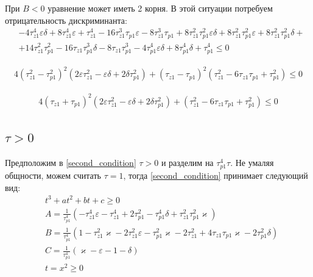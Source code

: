 \documentclass[a4paper,14pt]{extarticle} %
\begin{document}
При $B < 0$ уравнение может иметь 2 корня. В этой ситуации потребуем отрицательность дискриминанта:
 \begin{equation}
 \begin{aligned}
&-4\tau_{z1}^4 \varepsilon \delta + 8\tau_{z1}^4 \varepsilon + \tau_{z1}^4 - 16\tau_{z1}^3 \tau_{p1} \varepsilon - 8\tau_{z1}^3 \tau_{p1} + 8\tau_{z1}^2 \tau_{p1}^2 \varepsilon \delta + 8\tau_{z1}^2 \tau_{p1}^2 \varepsilon + 8\tau_{z1}^2 \tau_{p1}^2 \delta + \\
& + 14\tau_{z1}^2 \tau_{p1}^2 - 16\tau_{z1} \tau_{p1}^3 \delta - 8\tau_{z1} \tau_{p1}^3 - 4\tau_{p1}^4 \varepsilon \delta + 8\tau_{p1}^4 \delta + \tau_{p1}^4 \leq 0
 \end{aligned}
\end{equation}

 \begin{equation}
 \begin{aligned}
4(\tau_{z1}^2-\tau_{p1}^2)^2(2\varepsilon\tau_{z1}^2-\varepsilon\delta+2\delta\tau_{p1}^2)+(\tau_{z1}-\tau_{p1})^2(\tau_{z1}^2-6\tau_{z1}\tau_{p1}+\tau_{p1}^2)\leq 0
 \end{aligned}
\end{equation}

 \begin{equation}
 \begin{aligned}
4(\tau_{z1}+\tau_{p1})^2(2\varepsilon\tau_{z1}^2-\varepsilon\delta+2\delta\tau_{p1}^2)+(\tau_{z1}^2-6\tau_{z1}\tau_{p1}+\tau_{p1}^2)\leq 0
 \end{aligned}
\end{equation}

\subsection{$\tau > 0$}
Предположим в \eqref{second_condition} $\tau > 0$ и разделим на $\tau_{p1}^4\tau$. Не умаляя общности, можем считать $\tau = 1$, тогда \eqref{second_condition} принимает следующий вид:
 \begin{equation}
 \begin{aligned}
&t^3 +at^2 +bt + c  \geq 0\\
&A = \frac{1}{\tau_{p1}^4}(- \tau_{z1}^4\varepsilon - \tau_{z1}^4 + 2\tau_{p1}^2- \tau_{p1}^4\delta + \tau_{z1}^2\tau_{p1}^2\varkappa)\\
&B = \frac{1}{\tau_{p1}^4}( 1- \tau_{z1}^2\varkappa - 2\tau_{z1}^2\varepsilon - \tau_{p1}^2\varkappa- 2\tau_{z1}^2+ 4\tau_{z1}\tau_{p1}\varkappa- 2\tau_{p1}^2\delta)\\
&C = \frac{1}{\tau_{p1}^4}(\varkappa-\varepsilon - 1 - \delta)\\
&t = x^2 \geq 0
 \end{aligned}
\end{equation}
\end{document}
